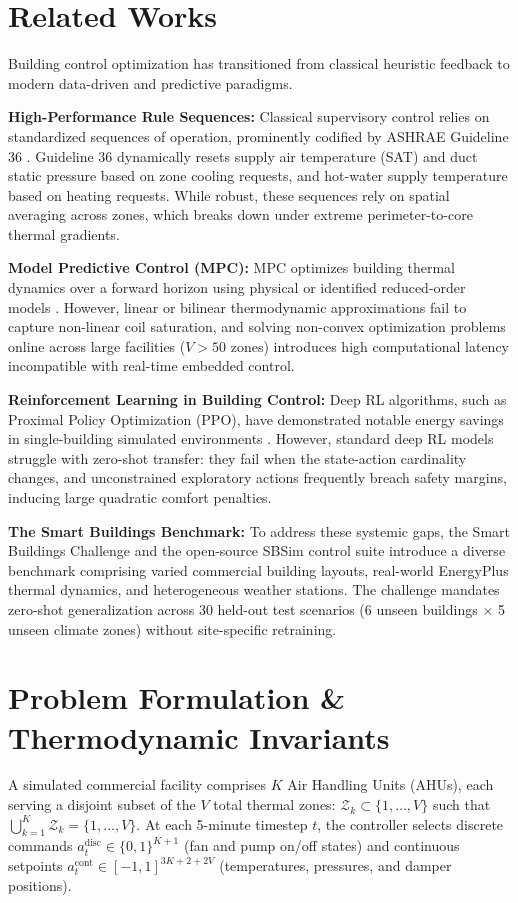 \documentclass{article}
\begin{document}
\section{Related Works}
Building control optimization has transitioned from classical heuristic feedback to modern data-driven and predictive paradigms.

\textbf{High-Performance Rule Sequences:} Classical supervisory control relies on standardized sequences of operation, prominently codified by ASHRAE Guideline 36 \cite{ashrae2018guideline36}. Guideline 36 dynamically resets supply air temperature (SAT) and duct static pressure based on zone cooling requests, and hot-water supply temperature based on heating requests. While robust, these sequences rely on spatial averaging across zones, which breaks down under extreme perimeter-to-core thermal gradients.

\textbf{Model Predictive Control (MPC):} MPC optimizes building thermal dynamics over a forward horizon using physical or identified reduced-order models \cite{zhang2019whole}. However, linear or bilinear thermodynamic approximations fail to capture non-linear coil saturation, and solving non-convex optimization problems online across large facilities ($V > 50$ zones) introduces high computational latency incompatible with real-time embedded control.

\textbf{Reinforcement Learning in Building Control:} Deep RL algorithms, such as Proximal Policy Optimization (PPO), have demonstrated notable energy savings in single-building simulated environments \cite{wang2020reinforcement}. However, standard deep RL models struggle with zero-shot transfer: they fail when the state-action cardinality changes, and unconstrained exploratory actions frequently breach safety margins, inducing large quadratic comfort penalties.

\textbf{The Smart Buildings Benchmark:} To address these systemic gaps, the Smart Buildings Challenge \cite{goldfeder2026smart} and the open-source SBSim control suite \cite{goldfeder2024smart} introduce a diverse benchmark comprising varied commercial building layouts, real-world EnergyPlus thermal dynamics, and heterogeneous weather stations. The challenge mandates zero-shot generalization across 30 held-out test scenarios (6 unseen buildings $\times$ 5 unseen climate zones) without site-specific retraining.

\section{Problem Formulation \& Thermodynamic Invariants}
A simulated commercial facility comprises $K$ Air Handling Units (AHUs), each serving a disjoint subset of the $V$ total thermal zones: $\mathcal{Z}_k \subset \{1, \dots, V\}$ such that $\bigcup_{k=1}^K \mathcal{Z}_k = \{1, \dots, V\}$. At each 5-minute timestep $t$, the controller selects discrete commands $a_t^{\text{disc}} \in \{0, 1\}^{K+1}$ (fan and pump on/off states) and continuous setpoints $a_t^{\text{cont}} \in [-1, 1]^{3K+2+2V}$ (temperatures, pressures, and damper positions).
\end{document}
